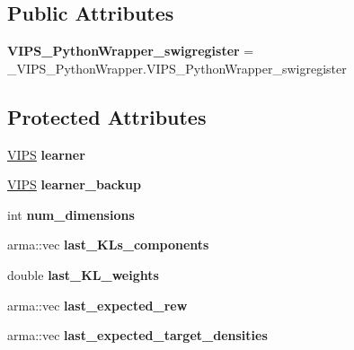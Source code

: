\subsection*{Public Attributes}
\begin{DoxyCompactItemize}
\item 
{\bfseries V\+I\+P\+S\+\_\+\+Python\+Wrapper\+\_\+swigregister} = \+\_\+\+V\+I\+P\+S\+\_\+\+Python\+Wrapper.\+V\+I\+P\+S\+\_\+\+Python\+Wrapper\+\_\+swigregister\hypertarget{classVIPS__PythonWrapper_aa04e2827ddc5b63a00d4a4890424613f}{}\label{classVIPS__PythonWrapper_aa04e2827ddc5b63a00d4a4890424613f}

\end{DoxyCompactItemize}
\subsection*{Protected Attributes}
\begin{DoxyCompactItemize}
\item 
\hyperlink{classVIPS}{V\+I\+PS} {\bfseries learner}\hypertarget{classVIPS__PythonWrapper_a967a73404906831a828f926b4fc8c7b2}{}\label{classVIPS__PythonWrapper_a967a73404906831a828f926b4fc8c7b2}

\item 
\hyperlink{classVIPS}{V\+I\+PS} {\bfseries learner\+\_\+backup}\hypertarget{classVIPS__PythonWrapper_aaa74d7a0f9b7039f49cd7736f0fd463a}{}\label{classVIPS__PythonWrapper_aaa74d7a0f9b7039f49cd7736f0fd463a}

\item 
int {\bfseries num\+\_\+dimensions}\hypertarget{classVIPS__PythonWrapper_ae70db7c8f890fe7bba73c15de92e9d0b}{}\label{classVIPS__PythonWrapper_ae70db7c8f890fe7bba73c15de92e9d0b}

\item 
arma\+::vec {\bfseries last\+\_\+\+K\+Ls\+\_\+components}\hypertarget{classVIPS__PythonWrapper_a0d7e2c9449dc4411ba71d623c8a4d236}{}\label{classVIPS__PythonWrapper_a0d7e2c9449dc4411ba71d623c8a4d236}

\item 
double {\bfseries last\+\_\+\+K\+L\+\_\+weights}\hypertarget{classVIPS__PythonWrapper_aa37f34c104c8b41f3d8fd7a1023da696}{}\label{classVIPS__PythonWrapper_aa37f34c104c8b41f3d8fd7a1023da696}

\item 
arma\+::vec {\bfseries last\+\_\+expected\+\_\+rew}\hypertarget{classVIPS__PythonWrapper_ad33747fdb016a926ab1ea3524aa2b36b}{}\label{classVIPS__PythonWrapper_ad33747fdb016a926ab1ea3524aa2b36b}

\item 
arma\+::vec {\bfseries last\+\_\+expected\+\_\+target\+\_\+densities}\hypertarget{classVIPS__PythonWrapper_afd270b0737302fb8a3e755057f4363c2}{}\label{classVIPS__PythonWrapper_afd270b0737302fb8a3e755057f4363c2}

\end{DoxyCompactItemize}


